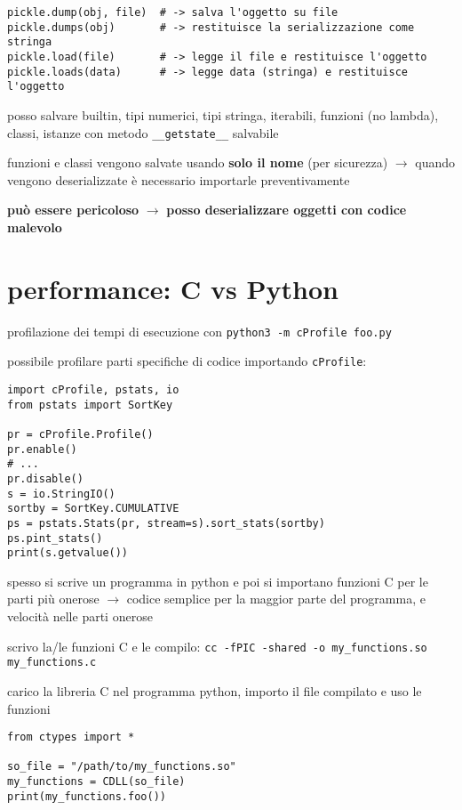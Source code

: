 \begin{verbatim}
pickle.dump(obj, file) 	# -> salva l'oggetto su file
pickle.dumps(obj) 		# -> restituisce la serializzazione come stringa
pickle.load(file) 		# -> legge il file e restituisce l'oggetto
pickle.loads(data) 		# -> legge data (stringa) e restituisce l'oggetto
\end{verbatim}

posso salvare builtin, tipi numerici, tipi stringa, iterabili, funzioni (no lambda), classi, istanze con metodo \texttt{__getstate__} salvabile

funzioni e classi vengono salvate usando \textbf{solo il nome} (per sicurezza) $\rightarrow$ quando vengono deserializzate \`e necessario importarle preventivamente

\textbf{pu\`o essere pericoloso} $\rightarrow$ \textbf{posso deserializzare oggetti con codice malevolo}

\section{performance: C vs Python}

profilazione dei tempi di esecuzione con \texttt{python3 -m cProfile foo.py}

possibile profilare parti specifiche di codice importando \texttt{cProfile}:

\begin{verbatim}
import cProfile, pstats, io
from pstats import SortKey

pr = cProfile.Profile()
pr.enable()
# ...
pr.disable()
s = io.StringIO()
sortby = SortKey.CUMULATIVE
ps = pstats.Stats(pr, stream=s).sort_stats(sortby)
ps.pint_stats()
print(s.getvalue())
\end{verbatim}

spesso si scrive un programma in python e poi si importano funzioni C per le parti pi\`u onerose $\rightarrow$ codice semplice per la maggior parte del programma, e velocit\`a nelle parti onerose

scrivo la/le funzioni  C e le compilo: \texttt{cc -fPIC -shared -o my_functions.so my_functions.c}

carico la libreria C nel programma python, importo il file compilato e uso le funzioni

\begin{verbatim}
from ctypes import *

so_file = "/path/to/my_functions.so"
my_functions = CDLL(so_file)
print(my_functions.foo())
\end{verbatim}

